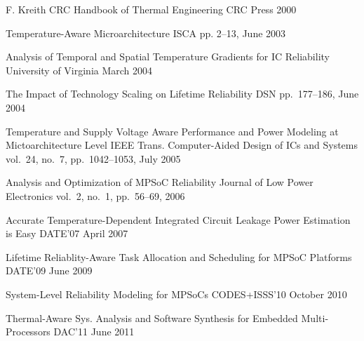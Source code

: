 \begin{thebibliography}{99}
  \small
    \publication
      {F. Kreith}
      {CRC Handbook of Thermal Engineering}
      {CRC Press}
      {2000}

    \publication
      {}
      {Temperature-Aware Microarchitecture}
      {ISCA}
      {pp. 2--13, June 2003}

    \publication
      {}
      {Analysis of Temporal and Spatial Temperature Gradients for IC Reliability}
      {University of Virginia}
      {March 2004}

    \publication
      {}
      {The Impact of Technology Scaling on Lifetime Reliability}
      {DSN}
      {pp.~177--186, June 2004}

    \publication
      {}
      {Temperature and Supply Voltage Aware Performance and Power Modeling at Mictoarchitecture Level}
      {IEEE Trans. Computer-Aided Design of ICs and Systems}
      {vol.~24, no.~7, pp.~1042--1053, July 2005}

    \publication
      {}
      {Analysis and Optimization of MPSoC Reliability}
      {Journal of Low Power Electronics}
      {vol.~2, no.~1, pp.~56--69, 2006}

    \publication
      {}
      {Accurate Temperature-Dependent Integrated Circuit Leakage Power Estimation is Easy}
      {DATE'07}
      {April 2007}

    \publication
      {}
      {Lifetime Reliablity-Aware Task Allocation and Scheduling for MPSoC Platforms}
      {DATE'09}
      {June 2009}

    \publication
      {}
      {System-Level Reliability Modeling for MPSoCs}
      {CODES+ISSS'10}
      {October 2010}

    \publication
      {}
      {Thermal-Aware Sys. Analysis and Software Synthesis for Embedded Multi-Processors}
      {DAC'11}
      {June 2011}


\end{thebibliography}
